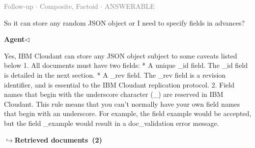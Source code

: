 \documentclass[a4paper,11pt]{article}
\begin{document}
\vspace{0.5em}
\hfill{\tiny\textcolor{gray}{Follow-up $\cdot$ Composite, Factoid $\cdot$ ANSWERABLE}}
\begin{userbubble}
So it can store any random JSON object or I need to specify fields in advances?
\end{userbubble}
\noindent\hfill{\small\textcolor{agentcolor}{\textbf{Agent\enspace$\triangleleft$}}}
\begin{agentbubble}
Yes, IBM Cloudant can store any JSON object subject to some caveats listed below
1. All documents must have two fields:
    * A unique \_id field. The \_id field is detailed in the next section.
    * A \_rev field. The \_rev field is a revision identifier, and is essential to the IBM Cloudant replication protocol.
2. Field names that begin with the underscore character (\_) are reserved in IBM Cloudant. This rule means that you can't normally have your own field names that begin with an underscore. For example, the field example would be accepted, but the field \_example would result in a doc\_validation error message.

\end{agentbubble}
\noindent\hfill{\footnotesize\textcolor{doccolor}{\textbf{$\hookrightarrow$\enspace Retrieved documents~(2)}}}
\end{document}
